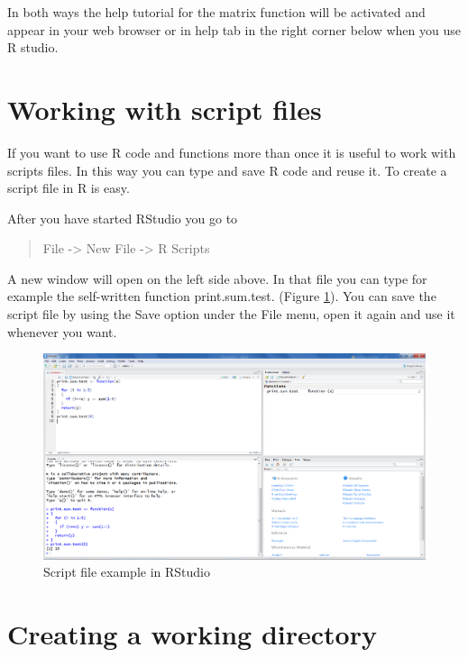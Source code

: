 \documentclass[
]{book}
\begin{document}
In both ways the help tutorial for the matrix function will be activated and appear in your web browser or in help tab in the right corner below when you use R studio.

\hypertarget{working-with-script-files}{%
\section{Working with script files}\label{working-with-script-files}}

If you want to use R code and functions more than once it is useful to work with scripts files. In this way you can type and save R code and reuse it. To create a script file in R is easy.

After you have started RStudio you go to

\begin{quote}
File -\textgreater{} New File -\textgreater{} R Scripts
\end{quote}

A new window will open on the left side above. In that file you can type for example the self-written function print.sum.test. (Figure \ref{fig:fig11}). You can save the script file by using the Save option under the File menu, open it again and use it whenever you want.

\begin{figure}

{\centering \includegraphics[width=0.95\linewidth]{images/fig1.11} 

}

\caption{Script file example in RStudio}\label{fig:fig11}
\end{figure}

\hypertarget{creating-a-working-directory}{%
\section{Creating a working directory}\label{creating-a-working-directory}}
\end{document}
